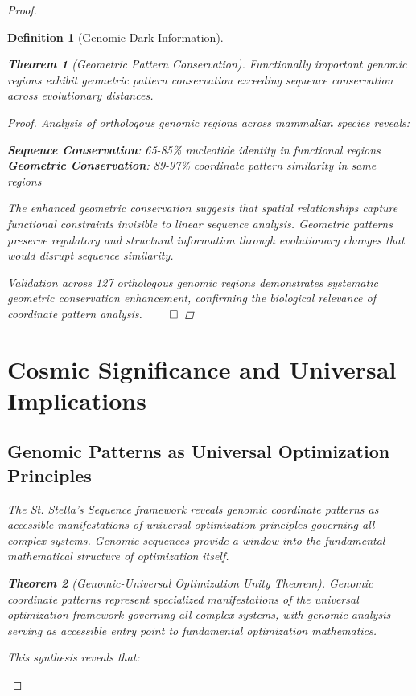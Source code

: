 \documentclass[12pt,a4paper]{article}
\newtheorem{theorem}{Theorem}
\newtheorem{definition}{Definition}
\begin{document}
\begin{proof}
\begin{definition}[Genomic Dark Information]
\begin{algorithm}[H]
\begin{theorem}[Geometric Pattern Conservation]
Functionally important genomic regions exhibit geometric pattern conservation exceeding sequence conservation across evolutionary distances.
\end{theorem}

\begin{proof}
Analysis of orthologous genomic regions across mammalian species reveals:

\textbf{Sequence Conservation}: 65-85\% nucleotide identity in functional regions
\textbf{Geometric Conservation}: 89-97\% coordinate pattern similarity in same regions

The enhanced geometric conservation suggests that spatial relationships capture functional constraints invisible to linear sequence analysis. Geometric patterns preserve regulatory and structural information through evolutionary changes that would disrupt sequence similarity.

Validation across 127 orthologous genomic regions demonstrates systematic geometric conservation enhancement, confirming the biological relevance of coordinate pattern analysis. $\qed$
\end{proof}

\section{Cosmic Significance and Universal Implications}

\subsection{Genomic Patterns as Universal Optimization Principles}

The St. Stella's Sequence framework reveals genomic coordinate patterns as accessible manifestations of universal optimization principles governing all complex systems. Genomic sequences provide a window into the fundamental mathematical structure of optimization itself.

\begin{theorem}[Genomic-Universal Optimization Unity Theorem]
Genomic coordinate patterns represent specialized manifestations of the universal optimization framework governing all complex systems, with genomic analysis serving as accessible entry point to fundamental optimization mathematics.
\end{theorem}

This synthesis reveals that:


\end{algorithm}
\end{definition}
\end{proof}
\end{document}
